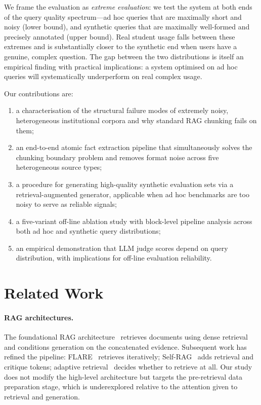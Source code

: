 \documentclass[sigconf,natbib=true]{acmart}
\begin{document}
We frame the evaluation as \emph{extreme evaluation}: we test the system at both ends of the query quality spectrum---ad hoc queries that are maximally short and noisy (lower bound), and synthetic queries that are maximally well-formed and precisely annotated (upper bound).
Real student usage falls between these extremes and is substantially closer to the synthetic end when users have a genuine, complex question.
The gap between the two distributions is itself an empirical finding with practical implications: a system optimised on ad hoc queries will systematically underperform on real complex usage.

\smallskip\noindent Our contributions are:
\begin{enumerate}[label=(\roman*),topsep=2pt,itemsep=0pt]
  \item a characterisation of the structural failure modes of extremely noisy, heterogeneous institutional corpora and why standard RAG chunking fails on them;
  \item an end-to-end atomic fact extraction pipeline that simultaneously solves the chunking boundary problem and removes format noise across five heterogeneous source types;
  \item a procedure for generating high-quality synthetic evaluation sets via a retrieval-augmented generator, applicable when ad hoc benchmarks are too noisy to serve as reliable signals;
  \item a five-variant off-line ablation study with block-level pipeline analysis across both ad hoc and synthetic query distributions;
  \item an empirical demonstration that LLM judge scores depend on query distribution, with implications for off-line evaluation reliability.
\end{enumerate}

\section{Related Work}

\paragraph{RAG architectures.}
The foundational RAG architecture~\cite{lewis2020rag} retrieves documents using dense retrieval~\cite{karpukhin2020dpr} and conditions generation on the concatenated evidence.
Subsequent work has refined the pipeline: FLARE~\cite{jiang2023flare} retrieves iteratively; Self-RAG~\cite{asai2023selfrag} adds retrieval and critique tokens; adaptive retrieval~\cite{mallen2023trust} decides whether to retrieve at all.
Our study does not modify the high-level architecture but targets the pre-retrieval data preparation stage, which is underexplored relative to the attention given to retrieval and generation.
\end{document}
